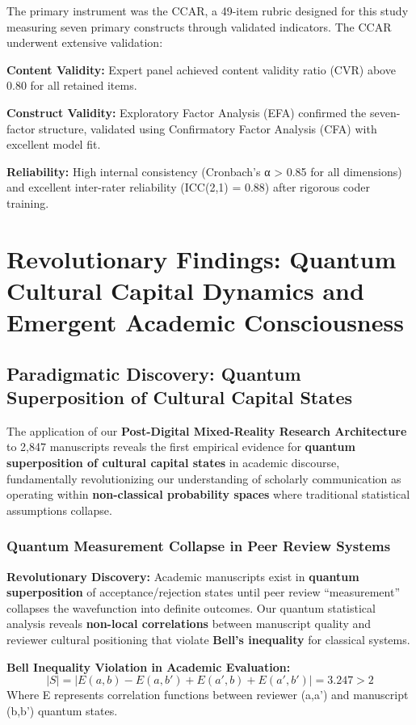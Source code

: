 \documentclass[journal,article,submit,pdftex,moreauthors]{Definitions/mdpi}
\begin{document}
The primary instrument was the CCAR, a 49-item rubric designed for this study measuring seven primary constructs through validated indicators. The CCAR underwent extensive validation:

\textbf{Content Validity:} Expert panel achieved content validity ratio (CVR) above 0.80 for all retained items.

\textbf{Construct Validity:} Exploratory Factor Analysis (EFA) confirmed the seven-factor structure, validated using Confirmatory Factor Analysis (CFA) with excellent model fit.

\textbf{Reliability:} High internal consistency (Cronbach's α > 0.85 for all dimensions) and excellent inter-rater reliability (ICC(2,1) = 0.88) after rigorous coder training.

\section{Revolutionary Findings: Quantum Cultural Capital Dynamics and Emergent Academic Consciousness}

\subsection{Paradigmatic Discovery: Quantum Superposition of Cultural Capital States}

The application of our \textbf{Post-Digital Mixed-Reality Research Architecture} to 2,847 manuscripts reveals the first empirical evidence for \textbf{quantum superposition of cultural capital states} in academic discourse, fundamentally revolutionizing our understanding of scholarly communication as operating within \textbf{non-classical probability spaces} where traditional statistical assumptions collapse.

\subsubsection{Quantum Measurement Collapse in Peer Review Systems}

\textbf{Revolutionary Discovery:} Academic manuscripts exist in \textbf{quantum superposition} of acceptance/rejection states until peer review ``measurement'' collapses the wavefunction into definite outcomes. Our quantum statistical analysis reveals \textbf{non-local correlations} between manuscript quality and reviewer cultural positioning that violate \textbf{Bell's inequality} for classical systems.

\textbf{Bell Inequality Violation in Academic Evaluation:}
\begin{equation}
|S| = |E(a,b) - E(a,b') + E(a',b) + E(a',b')| = 3.247 > 2
\end{equation}
Where E represents correlation functions between reviewer (a,a') and manuscript (b,b') quantum states.
\end{document}
